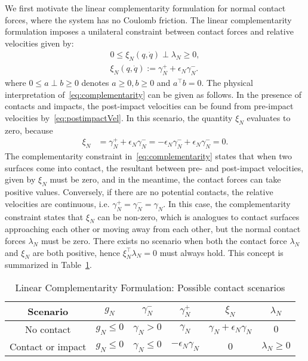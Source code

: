We first motivate the linear complementarity formulation for normal contact
forces, where the system has no Coulomb friction.
% 
The linear complementarity formulation imposes a unilateral constraint between
contact forces and relative velocities given by:
\begin{equation}
  \begin{gathered}
    0 \leq 
      \xi_N(q, \dot{q}) 
      \perp
      \lambda_N  
      \geq 0, \\
      \xi_N(q, \dot{q}) := \gamma_N^+ + \epsilon_N \gamma_N^-.
  \end{gathered}
  \label{eq:complementarity} 
\end{equation}
\noindent where $0 \leq a \perp b \geq 0$ denotes $a \geq 0, b \geq 0$ and
$a^\top b=0$.
% 
The physical interpretation of~\eqref{eq:complementarity} can be given as
follows.
%
%
In the presence of contacts and impacts, the post-impact velocities can be found
from pre-impact velocities by~\eqref{eq:postimpactVel}.
%
In this scenario, the quantity $\xi_N$ evaluates to zero, because
\begin{align*}
  \xi_N &= \gamma_N^+ + \epsilon_N \gamma_N^- = -\epsilon_N \gamma_N^- + \epsilon_N \gamma_N^- = 0.
\end{align*}
%
The complementarity constraint in~\eqref{eq:complementarity} states that when
two surfaces come into contact, the resultant between pre- and post-impact
velocities, given by $\xi_N$ must be zero, and in the meantime, the contact
forces can take positive values.
%
Conversely, if there are no potential contacts, the relative velocities are
continuous, i.e. $\gamma_N^+ = \gamma_N^- = \gamma_N$.
%
In this case, the complementarity constraint states that $\xi_N$ can be
non-zero, which is analogues to contact surfaces approaching each other or
moving away from each other, but the normal contact forces $\lambda_N$ must be
zero. 
%
There exists no scenario when both the contact force $\lambda_N$ and $\xi_N$ are
both positive, hence $\xi_N^\top \lambda_N = 0$ must always hold.
%
This concept is summarized in Table~\ref{tab:complementarity}.
%
%
\begin{table}[tb]
  \centering
  \caption{Linear Complementarity Formulation: Possible contact scenarios}
  \begin{tabular}{|c|c|c|c|c|c|}
    \hline
    Scenario & $g_N$ & $\gamma_N^-$ & $\gamma_N^+$ & $\xi_N$ & $\lambda_N$ \\
    \hline\hline
    No contact & $g_N \leq 0$  & $\gamma_N > 0$ & $\gamma_N$ & $ \gamma_N +\epsilon_N\gamma_N$ & $0$ \\
    Contact or impact & $g_N \leq 0$ &  $\gamma_N \leq 0$ & $- \epsilon_N \gamma_N$ & $0$ & $\lambda_N \geq 0$ \\
    \hline
  \end{tabular}
  \label{tab:complementarity}
\end{table}

